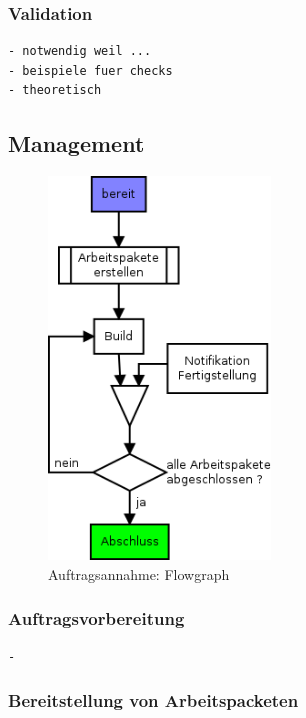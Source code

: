 \subsubsection{Validation}
\begin{verbatim}
- notwendig weil ...
- beispiele fuer checks
- theoretisch
\end{verbatim}


\subsection{Management}

\begin{figure}[ht] 
  \label{fig:lebenszyklus-auftrag-abarbeitung}
  \begin{center}
      \includegraphics[height=4in]{imageinput/lebenszyklus-auftrag-abarbeitung.png}
  \end{center}
  \caption{Auftragsannahme: Flowgraph}
\end{figure}

\subsubsection{Auftragsvorbereitung}

\begin{verbatim}
- 
\end{verbatim}


\subsubsection{Bereitstellung von Arbeitspacketen}
